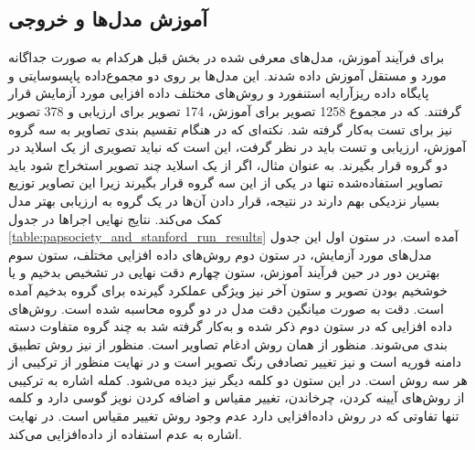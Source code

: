 \subsection{آموزش مدل‌ها و خروجی}\label{subsec:آموزش مدل‌ها و خروجی}
برای فرآیند آموزش، مدل‌های معرفی شده در بخش قبل هرکدام به صورت جداگانه مورد و مستقل آموزش داده شدند. این مدل‌ها بر روی دو مجموع‌داده پاپسوسایتی و پایگاه داده ریزآرایه استنفورد و روش‌های مختلف داده افزایی مورد آزمایش قرار گرفتند. که در مجموع 1258 تصویر برای آموزش، 174 تصویر برای ارزیابی و 378 تصویر نیز برای تست به‌کار گرفته شد. نکته‌ای که در هنگام تقسیم بندی تصاویر به سه گروه آموزش، ارزیابی و تست باید در نظر گرفت، این است که نباید تصویری از یک اسلاید در دو گروه قرار بگیرند. به عنوان مثال، اگر از یک اسلاید چند تصویر استخراج شود باید تصاویر استفاده‌شده تنها در یکی از این سه گروه قرار بگیرند زیرا این تصاویر توزیع بسیار نزدیکی بهم دارند در نتیجه، قرار دادن آن‌ها در یک گروه به ارزیابی بهتر مدل کمک می‌کند.
نتایج نهایی اجراها در جدول \ref{table:papsociety_and_stanford_run_results} آمده است.
در ستون اول این جدول مدل‌های مورد آزمایش، در ستون دوم روش‌های داده افزایی مختلف، ستون سوم بهترین دور در حین فرآیند آموزش، ستون چهارم دقت نهایی در تشخیص بدخیم و یا خوشخیم بودن تصویر و ستون آخر نیز ویژگی عملکرد گیرنده برای گروه بدخیم آمده است. دقت به صورت میانگین دقت مدل در دو گروه محاسبه شده است.
روش‌های داده افزایی که در ستون دوم ذکر شده و به‌کار گرفته شد به چند گروه متفاوت دسته بندی می‌شوند. منظور از  همان روش ادغام تصاویر است. منظور از  نیز روش تطبیق دامنه فوریه است و  نیز تغییر تصادفی رنگ تصویر است و در نهایت منظور از  ترکیبی از هر سه روش است. در این ستون دو کلمه دیگر نیز دیده می‌شود. کمله  اشاره به ترکیبی از روش‌های آیینه کردن، چرخاندن، تغییر مقیاس و اضافه کردن نویز گوسی دارد و کلمه  تنها تفاوتی که در روش داده‌افزایی دارد عدم وجود روش تغییر مقیاس است. در نهایت  اشاره به عدم استفاده از داده‌افزایی می‌کند.
